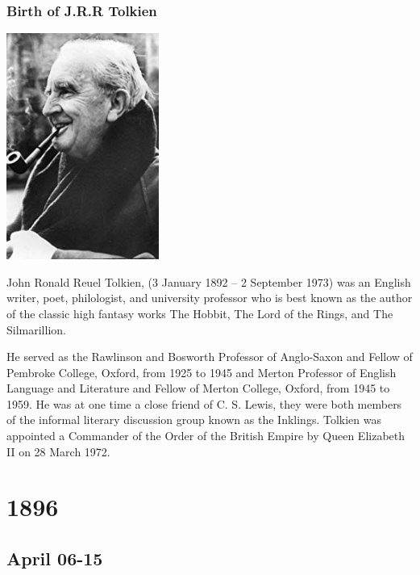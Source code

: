 \documentclass[11pt]{report}
\begin{document}
\subsection{Birth of J.R.R Tolkien}
\vspace{2mm}\begin{center}\includegraphics[width=5cm]{./img/jrrtolkien.jpg}\end{center}
John Ronald Reuel Tolkien, (3 January 1892 – 2 September 1973) was an English writer, poet, philologist, and university professor who is best known as the author of the classic high fantasy works The Hobbit, The Lord of the Rings, and The Silmarillion.

He served as the Rawlinson and Bosworth Professor of Anglo-Saxon and Fellow of Pembroke College, Oxford, from 1925 to 1945 and Merton Professor of English Language and Literature and Fellow of Merton College, Oxford, from 1945 to 1959. He was at one time a close friend of C. S. Lewis, they were both members of the informal literary discussion group known as the Inklings. Tolkien was appointed a Commander of the Order of the British Empire by Queen Elizabeth II on 28 March 1972.


\chapter{1896}
\section{April 06-15}
\end{document}
